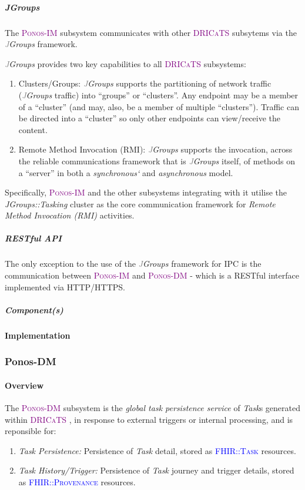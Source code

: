 \documentclass[a4paper]{book}
\newcommand{\dricats}{\textsc{\textcolor{Purple}{\small{DRICaTS }}}}
\newcommand{\ponosim}{\textsc{\textcolor{Purple}{\small{Ponos-IM }}}}
\newcommand{\ponosdm}{\textsc{\textcolor{Purple}{\small{Ponos-DM }}}}
\newcommand{\fhirtask}{\textsc{\textcolor{Blue}{\small{FHIR::Task }}}}
\newcommand{\fhirprovenance}{\textsc{\textcolor{Blue}{\small{FHIR::Provenance }}}}
\newcommand{\jgroups}{\textit{\textcolor{gray}JGroups }}
\begin{document}
\subparagraph*{JGroups}

The \ponosim subsystem communicates with other \dricats subsytems via the \jgroups framework.

\jgroups provides two key capabilities to all \dricats subsystems:
\begin{enumerate}[noitemsep]
 \item Clusters/Groups: \jgroups supports the  partitioning of network traffic (\jgroups traffic) into ``groups'' or ``clusters''. Any endpoint may be a member of a ``cluster'' (and may, also, be a member of multiple ``clusters''). Traffic can be directed into a ``cluster'' so only other endpoints can view/receive the content.
 \item Remote Method Invocation (RMI): \jgroups supports the invocation, across the reliable communications framework that is \jgroups itself, of methods on a ``server'' in both a \textit{synchronous`} and \textit{asynchronous} model.
\end{enumerate}

Specifically, \ponosim and the other subsystems integrating with it utilise the \textit{JGroups::Tasking} cluster as the core communication framework for  \textit{Remote Method Invocation (RMI)} activities.

\subparagraph*{RESTful API}


The only exception to the use of the \jgroups framework for IPC is the communication between \ponosim and \ponosdm - which is a RESTful interface implemented via HTTP/HTTPS.

\subparagraph{Component(s)}



\paragraph{Implementation}


\subsubsection{Ponos-DM}

\paragraph{Overview}

The \ponosdm subsystem is the \textit{global task persistence service} of \textit{Task}s generated within \dricats, in response to external triggers or internal processing, and is reponsible for:
\begin{enumerate}[noitemsep]
 \item \textit{Task Persistence:} Persistence of \textit{Task} detail, stored as \fhirtask resources.
 \item \textit{Task History/Trigger:} Persistence of \textit{Task} journey and trigger details, stored as \fhirprovenance resources.
\end{enumerate}
\end{document}
